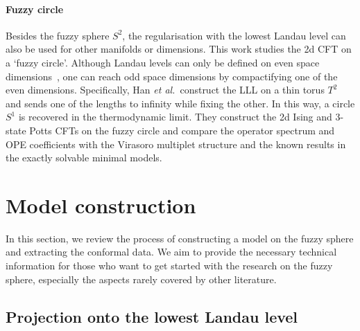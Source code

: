 \documentclass{timesjhep}
\begin{document}
\paragraph{Fuzzy circle~\cite{Han2025}}

Besides the fuzzy sphere $S^2$, the regularisation with the lowest Landau level can also be used for other manifolds or dimensions. This work studies the 2d CFT on a `fuzzy circle'. Although Landau levels can only be defined on even space dimensions~\cite{Hasebe2020Landau}, one can reach odd space dimensions by compactifying one of the even dimensions. Specifically, Han \textit{et al.}~construct the LLL on a thin torus $T^2$ and sends one of the lengths to infinity while fixing the other. In this way, a circle $S^1$ is recovered in the thermodynamic limit. They construct the 2d Ising and 3-state Potts CFTs on the fuzzy circle and compare the operator spectrum and OPE coefficients with the Virasoro multiplet structure and the known results in the exactly solvable minimal models.

\section{Model construction}
\label{sec:construct}

In this section, we review the process of constructing a model on the fuzzy sphere and extracting the conformal data. We aim to provide the necessary technical information for those who want to get started with the research on the fuzzy sphere, especially the aspects rarely covered by other literature.

\subsection{Projection onto the lowest Landau level}
\label{sec:setup}
\end{document}
